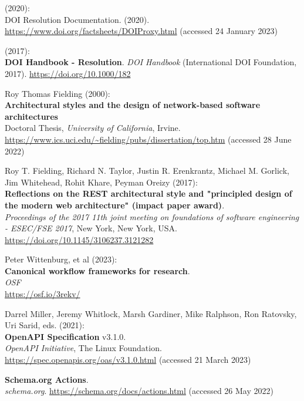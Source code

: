 \begin{thebibliography}{9}
(2020): \\
{DOI Resolution Documentation}. (2020).
\url{https://www.doi.org/factsheets/DOIProxy.html} (accessed 24 January
2023)

(2017): \\
\textbf{{DOI Handbook} - {Resolution}}. \emph{{DOI Handbook}}
({International DOI Foundation}, 2017).
\url{https://doi.org/10.1000/182}

Roy Thomas Fielding (2000): \\
\textbf{Architectural styles and the design
of network-based software architectures}\\
Doctoral Thesis, 
\emph{University of California}, Irvine.
\url{https://www.ics.uci.edu/~fielding/pubs/dissertation/top.htm}
(accessed 28 June 2022)

Roy T. Fielding, Richard N. Taylor, Justin R. Erenkrantz, Michael M.
Gorlick, Jim Whitehead, Rohit Khare, Peyman Oreizy (2017): \\
\textbf{Reflections on the {REST} architectural style and "principled
design of the modern web architecture" (impact paper award)}. \\
\emph{Proceedings of the 2017 11th joint meeting on foundations of software engineering - {ESEC}/{FSE} 2017}, New York, New York, USA.\\
\url{https://doi.org/10.1145/3106237.3121282}

Peter Wittenburg, et al (2023): \\
\textbf{Canonical workflow frameworks for research}. \\
\emph{OSF}\\
\url{https://osf.io/3rekv/}

Darrel Miller, Jeremy Whitlock, Marsh Gardiner, Mike Ralphson, Ron
Ratovsky, Uri Sarid, eds. (2021): \\
\textbf{OpenAPI Specification} v3.1.0.\\
\emph{OpenAPI Initiative}, The Linux Foundation.
\url{https://spec.openapis.org/oas/v3.1.0.html} (accessed 21
March 2023)

\textbf{Schema.org {Actions}}.\\
\emph{schema.org}.
\url{https://schema.org/docs/actions.html} (accessed 26 May 2022)


\end{thebibliography}
